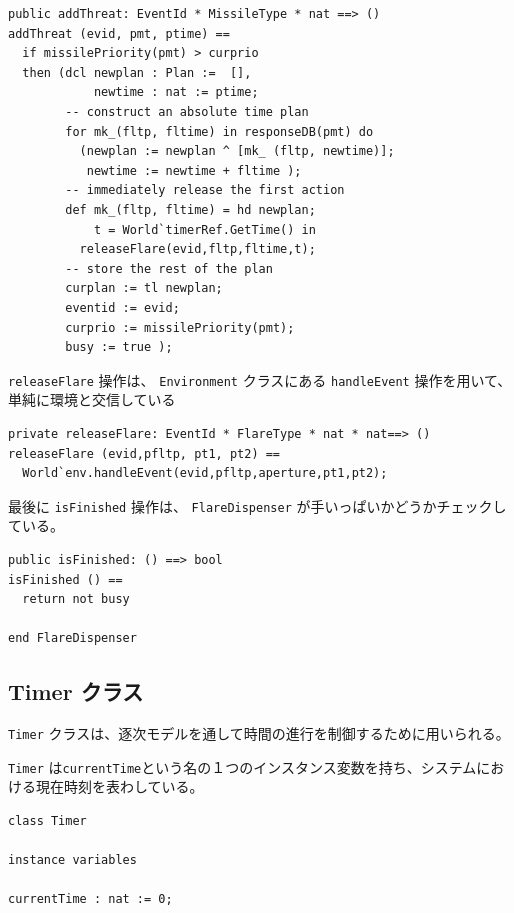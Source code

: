 \documentclass[\pformat,12pt]{jreport}
\begin{document}
\begin{lstlisting}
public addThreat: EventId * MissileType * nat ==> ()
addThreat (evid, pmt, ptime) ==
  if missilePriority(pmt) > curprio
  then (dcl newplan : Plan :=  [],
            newtime : nat := ptime;
        -- construct an absolute time plan
        for mk_(fltp, fltime) in responseDB(pmt) do
          (newplan := newplan ^ [mk_ (fltp, newtime)];
           newtime := newtime + fltime );
        -- immediately release the first action
        def mk_(fltp, fltime) = hd newplan;
            t = World`timerRef.GetTime() in
          releaseFlare(evid,fltp,fltime,t);
        -- store the rest of the plan
        curplan := tl newplan;
        eventid := evid;
        curprio := missilePriority(pmt);
        busy := true );
\end{lstlisting}

 \texttt{releaseFlare} 操作は、 \texttt{Environment} クラスにある  \texttt{handleEvent} 操作を用いて、単純に環境と交信している

\begin{lstlisting}
private releaseFlare: EventId * FlareType * nat * nat==> ()
releaseFlare (evid,pfltp, pt1, pt2) == 
  World`env.handleEvent(evid,pfltp,aperture,pt1,pt2);
\end{lstlisting}

最後に \texttt{isFinished} 操作は、 \texttt{FlareDispenser} が手いっぱいかどうかチェックしている。

\begin{lstlisting}
public isFinished: () ==> bool
isFinished () == 
  return not busy

end FlareDispenser
\end{lstlisting}

\subsection{Timer クラス}\label{sec:timerclass}

\texttt{Timer} クラスは、逐次モデルを通して時間の進行を制御するために用いられる。

 \texttt{Timer} は\texttt{currentTime}という名の１つのインスタンス変数を持ち、システムにおける現在時刻を表わしている。

\begin{lstlisting}
class Timer

instance variables

currentTime : nat := 0;
\end{lstlisting}
\end{document}
